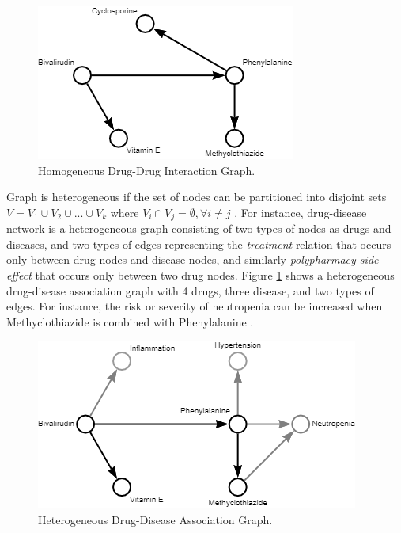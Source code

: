 \begin{figure}
    \centering
        \includegraphics[width=0.5\linewidth]{chapters/background/figures/ddi.png} 
    \caption{Homogeneous Drug-Drug Interaction Graph.}
    \label{fig:sample_ddi}
\end{figure}

Graph is heterogeneous if the set of nodes can be partitioned into disjoint sets $V = V_{1} \cup V_{2} \cup ... \cup V_{k} $ where $V_{i} \cap V_{j} = \emptyset , \forall i \neq j$ \cite{sun2013mining}. For instance, drug-disease network is a heterogeneous graph consisting of two types of nodes as drugs and diseases, and two types of edges representing the \textit{treatment} relation that occurs only between drug nodes and disease nodes, and similarly \textit{polypharmacy side effect} that occurs only between two drug nodes. Figure \ref{fig:sample_ddi} shows a heterogeneous drug-disease association graph with 4 drugs, three disease, and two types of edges. For instance, the risk or severity of neutropenia can be increased when Methyclothiazide is combined with Phenylalanine \cite{ruiz2022primary}. 

\begin{figure}
    \centering
        \includegraphics[width=0.65\linewidth]{chapters/background/figures/dda.png} 
    \caption{Heterogeneous Drug-Disease Association Graph.}
    \label{fig:sample_dda}
\end{figure}


